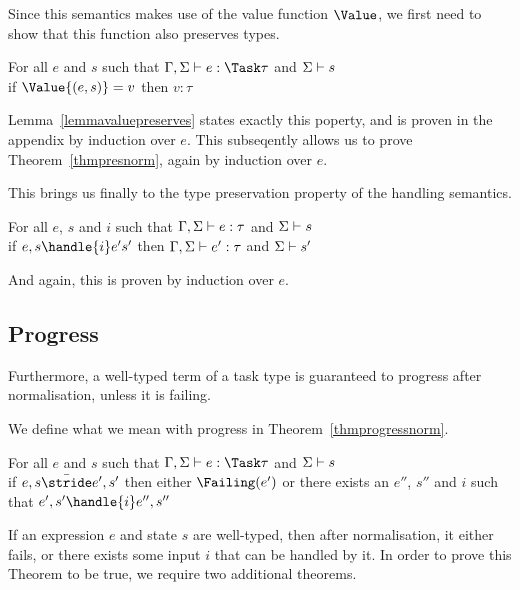 Since this semantics makes use of the value function $\Value$, we first need to
show that this function also preserves types.

\begin{lemma}
  For all $e$ and $s$ such that $\Gamma,\Sigma\infers e:\Task\tau$ and $\Sigma\vdash s$\\
  if $\Value{(e,s)}=v$ then $v:\tau$
  \label{lemmavaluepreserves}
\end{lemma}

Lemma~\ref{lemmavaluepreserves} states exactly this poperty, and is proven in the
appendix by induction over $e$. This subseqently allows us to prove
Theorem~\ref{thmpresnorm}, again by induction over $e$.

This brings us finally to the type preservation property of the handling semantics.

\begin{theorem}
  For all $e$, $s$ and $i$ such that $\Gamma,\Sigma\vdash e:\tau$ and $\Sigma\vdash s$\\
  if $ e,s \handle{i} e's'$ then $\Gamma,\Sigma\vdash e':\tau$ and $\Sigma\vdash s'$
   \label{thmpreshandle}
\end{theorem}

And again, this is proven by induction over $e$.

\subsection{Progress}

Furthermore, a well-typed term of a task type is guaranteed to progress after
normalisation, unless it is failing.

We define what we mean with progress in Theorem~\ref{thmprogressnorm}.

\begin{theorem}
  For all $e$ and $s$ such that $\Gamma,\Sigma\infers e:\Task\tau$ and $\Sigma\vdash s$\\
  if $e,s \bar{\stride} e',s'$ then either $\Failing(e')$ or there exists an $e''$, $s''$ and $i$ such that $e',s'\handle{i}e'',s''$
  \label{thmprogressnorm}
\end{theorem}

If an expression $e$ and state $s$ are well-typed, then after normalisation, it
either fails, or there exists some input $i$ that can be handled by it.
In order to prove this Theorem to be true, we require two additional theorems.

